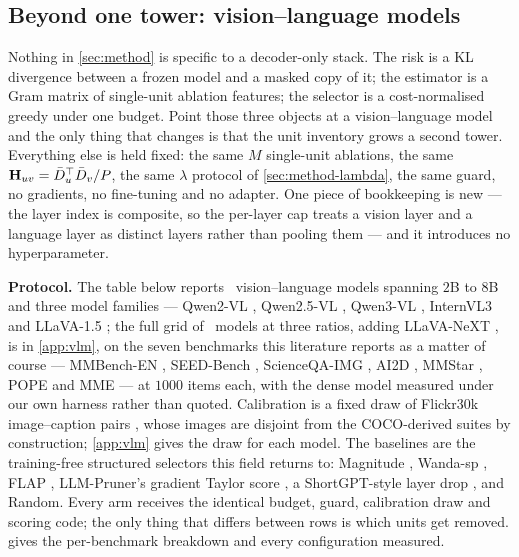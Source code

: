 \subsection{Beyond one tower: vision--language models}
\label{sec:exp-vlm}

Nothing in \cref{sec:method} is specific to a decoder-only stack. The risk is a KL divergence between
a frozen model and a masked copy of it; the estimator is a Gram matrix of single-unit ablation
features; the selector is a cost-normalised greedy under one budget. Point those three objects at a
vision--language model and the only thing that changes is that the unit inventory grows a second
tower. Everything else is held fixed: the same $M$ single-unit ablations, the same
$\mathbf{H}_{uv}=\bar{D}_u^{\top}\bar{D}_v/P$, the same $\lambda$ protocol of \cref{sec:method-lambda}, the
same guard, no gradients, no fine-tuning and no adapter. One piece of bookkeeping is new --- the layer
index is composite, so the per-layer cap treats a vision layer and a language layer as distinct
layers rather than pooling them --- and it introduces no hyperparameter.

\textbf{Protocol.} The table below reports \vlmNcolsW\ vision--language models spanning $2$B to
$8$B and three model families --- Qwen2-VL \citep{wang2024qwen2vl}, Qwen2.5-VL
\citep{bai2025qwen25vl}, Qwen3-VL \citep{qwen3vl2025}, InternVL3 \citep{zhu2025internvl3} and
LLaVA-1.5 \citep{liu2024llava15}; the full grid of \vlmGridModelsW\ models at three ratios, adding
LLaVA-NeXT \citep{liu2024llavanext}, is in \cref{app:vlm}, on the
seven benchmarks this literature reports as a matter of course --- MMBench-EN
\citep{liu2024mmbench}, SEED-Bench \citep{li2024seedbench}, ScienceQA-IMG \citep{lu2022scienceqa},
AI2D \citep{kembhavi2016ai2d}, MMStar \citep{chen2024mmstar}, POPE \citep{li2023pope} and MME
\citep{fu2023mme} --- at $1000$ items each, with the dense model measured
under our own harness rather than quoted. Calibration is a fixed draw of Flickr30k image--caption pairs
\citep{young2014flickr30k}, whose images are disjoint from the COCO-derived suites by construction;
\cref{app:vlm} gives the draw for each model. The baselines are the
training-free structured selectors this field returns to: Magnitude \citep{han2015learning},
Wanda-sp \citep{sun2024wanda}, FLAP \citep{an2024flap}, LLM-Pruner's gradient Taylor score
\citep{ma2023llmpruner}, a ShortGPT-style layer drop \citep{men2024shortgpt}, and Random. Every arm receives the identical
budget, guard, calibration draw and scoring code; the only thing that differs between rows is which
units get removed.  gives the per-benchmark breakdown and every configuration measured.

